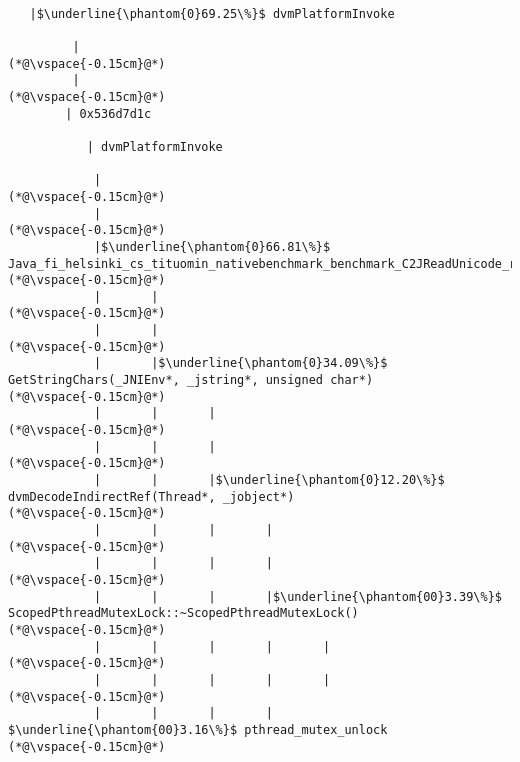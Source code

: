
\begin{lstlisting}[caption=Unicode-merkkijonon osoitinoperaatio, label=profile:C2JReadUnicode-512, numberbychapter=true, frame=lines, float, floatplacement=t]

   |$\underline{\phantom{0}69.25\%}$ dvmPlatformInvoke

         |
(*@\vspace{-0.15cm}@*)
         |
(*@\vspace{-0.15cm}@*)
        | 0x536d7d1c

           | dvmPlatformInvoke

            |
(*@\vspace{-0.15cm}@*)
            |
(*@\vspace{-0.15cm}@*)
            |$\underline{\phantom{0}66.81\%}$ Java_fi_helsinki_cs_tituomin_nativebenchmark_benchmark_C2JReadUnicode_runInternal
(*@\vspace{-0.15cm}@*)
            |       |
(*@\vspace{-0.15cm}@*)
            |       |
(*@\vspace{-0.15cm}@*)
            |       |$\underline{\phantom{0}34.09\%}$ GetStringChars(_JNIEnv*, _jstring*, unsigned char*)
(*@\vspace{-0.15cm}@*)
            |       |       |
(*@\vspace{-0.15cm}@*)
            |       |       |
(*@\vspace{-0.15cm}@*)
            |       |       |$\underline{\phantom{0}12.20\%}$ dvmDecodeIndirectRef(Thread*, _jobject*)
(*@\vspace{-0.15cm}@*)
            |       |       |       |
(*@\vspace{-0.15cm}@*)
            |       |       |       |
(*@\vspace{-0.15cm}@*)
            |       |       |       |$\underline{\phantom{00}3.39\%}$ ScopedPthreadMutexLock::~ScopedPthreadMutexLock()
(*@\vspace{-0.15cm}@*)
            |       |       |       |       |
(*@\vspace{-0.15cm}@*)
            |       |       |       |       |
(*@\vspace{-0.15cm}@*)
            |       |       |       |        $\underline{\phantom{00}3.16\%}$ pthread_mutex_unlock
(*@\vspace{-0.15cm}@*)

\end{lstlisting}
